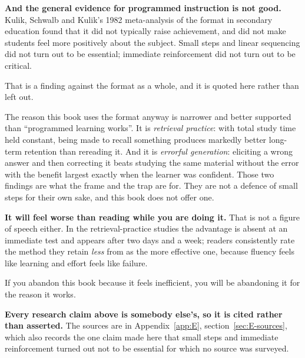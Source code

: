 \begin{warning}
\textbf{And the general evidence for programmed instruction is not good.}
Kulik, Schwalb and Kulik's 1982 meta-analysis of the format in secondary
education found that it did not typically raise achievement, and did not make
students feel more positively about the subject. Small steps and linear
sequencing did not turn out to be essential; immediate reinforcement did not
turn out to be critical.

That is a finding against the format as a whole, and it is quoted here rather
than left out.

The reason this book uses the format anyway is narrower and better supported
than \enquote{programmed learning works}. It is \emph{retrieval practice}: with
total study time held constant, being made to recall something produces
markedly better long-term retention than rereading it. And it is
\emph{errorful generation}: eliciting a wrong answer and then correcting it
beats studying the same material without the error \dash{} with the benefit
largest exactly when the learner was confident. Those two findings are what the
frame and the trap are for. They are not a defence of small steps for their own
sake, and this book does not offer one.
\end{warning}

\begin{warning}
\textbf{It will feel worse than reading while you are doing it.} That is not a
figure of speech either. In the retrieval-practice studies the advantage is
absent at an immediate test and appears after two days and a week; readers
consistently rate the method they retain \emph{less} from as the more
effective one, because fluency feels like learning and effort feels like
failure.

If you abandon this book because it feels inefficient, you will be abandoning
it for the reason it works.

\medskip
\textbf{Every research claim above is somebody else's, so it is cited rather
than asserted.} The sources are in Appendix~\ref{app:E},
section~\ref{sec:E-sources}, which also records the one claim made here
\dash{} that small steps and immediate reinforcement turned out not to be
essential \dash{} for which no source was surveyed.
\end{warning}
